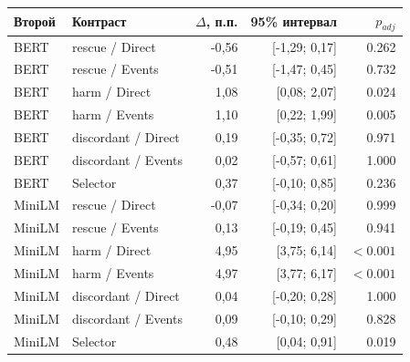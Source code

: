 \begin{tabular}{llrrr}
\toprule
Второй & Контраст & $\Delta$, п.п. & 95\% интервал & $p_{adj}$ \\
\midrule
BERT & rescue / Direct & -0{,}56 & [-1{,}29; 0{,}17] & 0.262 \\
BERT & rescue / Events & -0{,}51 & [-1{,}47; 0{,}45] & 0.732 \\
BERT & harm / Direct & 1{,}08 & [0{,}08; 2{,}07] & 0.024 \\
BERT & harm / Events & 1{,}10 & [0{,}22; 1{,}99] & 0.005 \\
BERT & discordant / Direct & 0{,}19 & [-0{,}35; 0{,}72] & 0.971 \\
BERT & discordant / Events & 0{,}02 & [-0{,}57; 0{,}61] & 1.000 \\
BERT & Selector & 0{,}37 & [-0{,}10; 0{,}85] & 0.236 \\
MiniLM & rescue / Direct & -0{,}07 & [-0{,}34; 0{,}20] & 0.999 \\
MiniLM & rescue / Events & 0{,}13 & [-0{,}19; 0{,}45] & 0.941 \\
MiniLM & harm / Direct & 4{,}95 & [3{,}75; 6{,}14] & $<0.001$ \\
MiniLM & harm / Events & 4{,}97 & [3{,}77; 6{,}17] & $<0.001$ \\
MiniLM & discordant / Direct & 0{,}04 & [-0{,}20; 0{,}28] & 1.000 \\
MiniLM & discordant / Events & 0{,}09 & [-0{,}10; 0{,}29] & 0.828 \\
MiniLM & Selector & 0{,}48 & [0{,}04; 0{,}91] & 0.019 \\
\bottomrule
\end{tabular}
